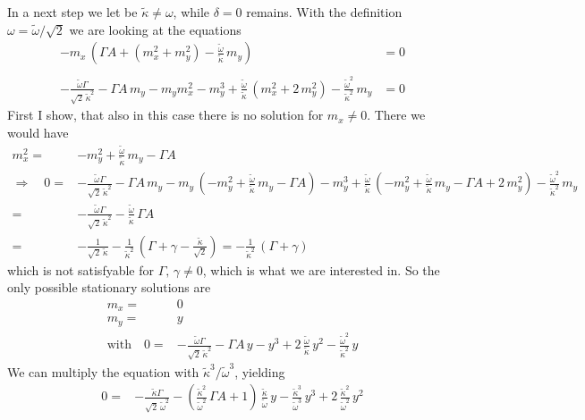 \documentclass{article}
\begin{document}
In a next step we let be $\tilde{\kappa}\neq\omega$, while $\delta=0$ remains. With the definition $\omega=\tilde{\omega}/\sqrt{2}$ we are looking at the equations
\begin{align*}
    -m_x\,\left(\Gamma A+( m_x^2+ m_y^2)-\frac{\tilde{\omega}}{\tilde{\kappa}}\,m_y\right)  &=0\\\\
    -\frac{\tilde{\omega}\Gamma}{\sqrt{2}\,\tilde{\kappa}^2}-\Gamma A\,m_y    -m_ym_x^2- m_y^3+\frac{\tilde{\omega}}{\tilde{\kappa}}\,(m_x^2+2\,m_y^2)-\frac{\tilde{\omega}^2}{\tilde{\kappa}^2}\,m_y  &=0
\end{align*}
First I show, that also in this case there is no solution for $m_x\neq0$. There we would have
\begin{align*}
    m_x^2=&-m_y^2+\frac{\tilde{\omega}}{\tilde{\kappa}}\,m_y-\Gamma A \\
    \Rightarrow\quad0=&-\frac{\tilde{\omega}\Gamma}{\sqrt{2}\,\tilde{\kappa}^2}-\Gamma A\,m_y    -m_y\,(-m_y^2+\frac{\tilde{\omega}}{\tilde{\kappa}}\,m_y-\Gamma A)- m_y^3+\frac{\tilde{\omega}}{\tilde{\kappa}}\,(-m_y^2+\frac{\tilde{\omega}}{\tilde{\kappa}}\,m_y-\Gamma A+2\,m_y^2)-\frac{\tilde{\omega}^2}{\tilde{\kappa}^2}\,m_y  \\
    =&-\frac{\tilde{\omega}\Gamma}{\sqrt{2}\,\tilde{\kappa}^2}-\frac{\tilde{\omega}}{\tilde{\kappa}}\,\Gamma A\\
    =&-\frac{1}{\sqrt{2}\,\tilde{\kappa}}-\frac{1}{\tilde{\kappa}^2}\,(\Gamma+\gamma-\frac{\tilde{\kappa}}{\sqrt{2}})=-\frac{1}{\tilde{\kappa}^2}\,(\Gamma+\gamma)
\end{align*} 
which is not satisfyable for $\Gamma,\,\gamma\neq0$, which is what we are interested in. So the only possible stationary solutions are
\begin{align*}
    m_x=&0\\
    m_y=&y\\
    \text{with}\quad0=&-\frac{\tilde{\omega}\Gamma}{\sqrt{2}\,\tilde{\kappa}^2}-\Gamma A\,y    - y^3+2\,\frac{\tilde{\omega}}{\tilde{\kappa}}\,y^2-\frac{\tilde{\omega}^2}{\tilde{\kappa}^2}\,y  
\end{align*}
We can multiply the equation with $\tilde{\kappa}^3/\tilde{\omega}^3$, yielding
\begin{align*}
    0=&-\frac{\tilde{\kappa}\Gamma}{\sqrt{2}\,\tilde{\omega}^2}-(\frac{\tilde{\kappa}^2}{\tilde{\omega}^2}\,\Gamma A+1)\,\frac{\tilde{\kappa}}{\tilde{\omega}}\,y    - \frac{\tilde{\kappa}^3}{\tilde{\omega}^3}\,y^3+2\,\frac{\tilde{\kappa}^2}{\tilde{\omega}^2}\,y^2 
\end{align*}
\end{document}
